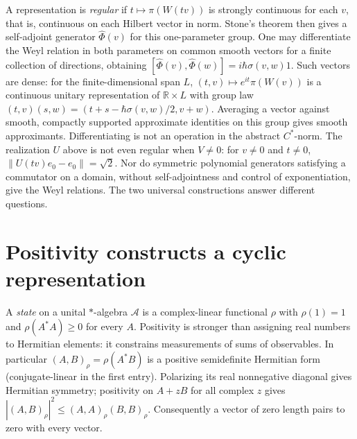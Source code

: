A representation is \emph{regular} if $t\mapsto\pi(W(tv))$ is strongly continuous for each $v$, that is, continuous on each Hilbert vector in norm. Stone's theorem then gives a self-adjoint generator $\widehat\Phi(v)$ for this one-parameter group. One may differentiate the Weyl relation in both parameters on common smooth vectors for a finite collection of directions, obtaining $[\widehat\Phi(v),\widehat\Phi(w)]=i\hbar\sigma(v,w)1$. Such vectors are dense: for the finite-dimensional span $L$, $(t,v)\mapsto e^{it}\pi(W(v))$ is a continuous unitary representation of $\mathbb R\times L$ with group law $(t,v)(s,w)=(t+s-\hbar\sigma(v,w)/2,v+w)$. Averaging a vector against smooth, compactly supported approximate identities on this group gives smooth approximants. Differentiating is not an operation in the abstract $C^*$-norm. The realization $U$ above is not even regular when $V\ne0$: for $v\ne0$ and $t\ne0$, $\|U(tv)e_0-e_0\|=\sqrt2$. Nor do symmetric polynomial generators satisfying a commutator on a domain, without self-adjointness and control of exponentiation, give the Weyl relations. The two universal constructions answer different questions.

\section{Positivity constructs a cyclic representation}
A \emph{state} on a unital $*$-algebra $\mathcal A$ is a complex-linear functional $\rho$ with $\rho(1)=1$ and $\rho(A^*A)\ge0$ for every $A$. Positivity is stronger than assigning real numbers to Hermitian elements: it constrains measurements of sums of observables. In particular $(A,B)_\rho=\rho(A^*B)$ is a positive semidefinite Hermitian form (conjugate-linear in the first entry). Polarizing its real nonnegative diagonal gives Hermitian symmetry; positivity on $A+zB$ for all complex $z$ gives $|(A,B)_\rho|^2\le(A,A)_\rho(B,B)_\rho$. Consequently a vector of zero length pairs to zero with every vector.

